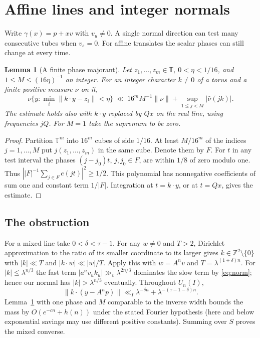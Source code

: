 \documentclass[11pt,a4paper,reqno]{amsart}
\newtheorem{lemma}[theorem]{Lemma}
\theoremstyle{definition}
\theoremstyle{remark}
\numberwithin{equation}{section}
\begin{document}
\section{Affine lines and integer normals}\label{sec:lines}
Write \(\gamma(x)=p+xv\) with \(v_u\ne0\). A single normal direction
can test many consecutive tubes when \(v_s=0\). For affine translates
the scalar phases can still change at every time.

\begin{lemma}[A finite phase majorant]\label{lem:majorant}
Let \(z_1,\ldots,z_m\in\mathbb T\), \(0<\eta<1/16\), and
\(1\le M\le(16\eta)^{-1}\) an integer. For an integer character
\(k\ne0\) of a torus and a finite positive measure \(\nu\) on it,
\[
 \nu\{y:\min_i\|k\cdot y-z_i\|<\eta\}
 \ \ll\ 16^m M^{-1}\|\nu\|
             +\sup_{1\le j<M}|\widehat\nu(jk)|.
\]
The estimate holds also with \(k\cdot y\) replaced by \(Qx\) on
the real line, using frequencies \(jQ\). For \(M=1\) take the supremum
to be zero.
\end{lemma}
\begin{proof}
Partition \(\mathbb T^m\) into \(16^m\) cubes of side \(1/16\).
At least \(M/16^m\) of the indices \(j=1,\ldots,M\) put
\(j(z_1,\ldots,z_m)\) in the same cube. Denote them by \(F\). For
\(t\) in any test interval the phases \((j-j_0)t\), \(j,j_0\in F\),
are within \(1/8\) of zero modulo one. Thus
\(\left||F|^{-1}\sum_{j\in F}e(jt)\right|^2\ge1/2\).
This polynomial has nonnegative coefficients of sum one and constant
term \(1/|F|\). Integration at \(t=k\cdot y\), or at \(t=Qx\), gives
the estimate.
\end{proof}

\subsection{The obstruction}
For a mixed line take \(0<\delta<\tau-1\). For any \(w\ne0\) and \(T>2\),
Dirichlet approximation to the ratio of its smaller coordinate to its
larger gives \(k\in\mathbb Z^2\setminus\{0\}\) with \(|k|\ll T\) and
\(|k\cdot w|\ll |w|/T\). Apply this with \(w=A^nv\) and
\(T=\lambda^{(1+\delta)n}\). For \(|k|\le\lambda^{n/3}\) the fast
term \(|a^nv_uk_u|\gg_v\lambda^{2n/3}\) dominates the slow term
by \eqref{eq:norm}; hence our normal has \(|k|>\lambda^{n/3}\) eventually.
Throughout \(U_n(I)\),
\[
 \|k\cdot(y-A^np)\|\ll_I
          \lambda^{-\delta n}+\lambda^{-(\tau-1-\delta)n}.
\]
Lemma~\ref{lem:majorant} with one phase and \(M\) comparable to the
inverse width bounds the mass by \(O(e^{-cn}+h(n))\) under the stated
Fourier hypothesis (here and below exponential savings may use different
positive constants). Summing over \(S\) proves the mixed converse.
\end{document}
